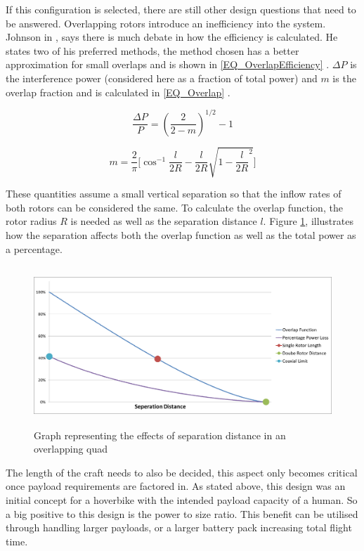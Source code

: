 If this configuration is selected, there are still other design questions that need to be answered. Overlapping rotors introduce an inefficiency into the system. Johnson in \cite{HeliTheory}, says there is much debate in how the efficiency is calculated. He states two of his preferred methods, the method chosen has a better approximation for small overlaps and is shown in \eqref{EQ_OverlapEfficiency} \cite{HeliTheory}. $\Delta P$ is the interference power (considered here as a fraction of total power) and $m$ is the overlap fraction and is calculated in \eqref{EQ_Overlap} \cite{HeliTheory}.

\begin{equation}
\label{EQ_OverlapEfficiency}
\frac{\Delta P}{P} = (\frac{2}{2-m})^{1/2} - 1
\end{equation}

\begin{equation}
\label{EQ_Overlap}
m = \frac{2}{\pi} \Bigg[ \cos^{-1}\frac{l}{2R} - \dfrac{l}{2R}\sqrt{1 - {\dfrac{l}{2R}}^2} \Bigg]
\end{equation}

These quantities assume a small vertical separation so that the inflow rates of both rotors can be considered the same. To calculate the overlap function, the rotor radius $R$ is needed as well as the separation distance $l$. Figure \ref{IM_SeperationGraph}, illustrates how the separation affects both the  overlap function as well as the total power as a percentage.


\begin{figure}[]
\centering
\includegraphics[height = 6cm]{Images/Design/SeperationGraph}
\caption{Graph representing the effects of separation distance in an overlapping quad}
\label{IM_SeperationGraph}
\end{figure}


The length of the craft needs to also be decided, this aspect only becomes critical once payload requirements are factored in. As stated above, this design was an initial concept for a hoverbike with the intended payload capacity of a human. So a big positive to this design is the power to size ratio. This benefit can be utilised through handling larger payloads, or a larger battery pack increasing total flight time.

